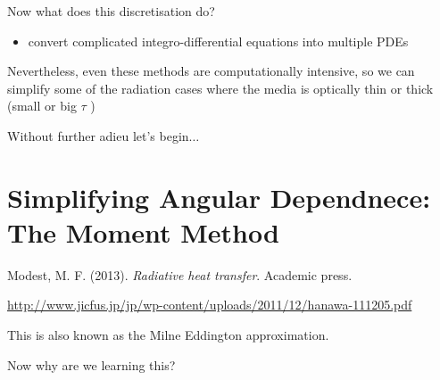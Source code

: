\documentclass[12pt]{article}
\renewcommand{\_}{\kern-1.5pt\textunderscore\kern-1.5pt}
\begin{document}
Now what does this discretisation do?\par

\begin{itemize}
	\item convert complicated integro-differential equations into multiple PDEs\par

\end{itemize}

Nevertheless, even these methods are computationally intensive, so we can simplify some of the radiation cases where the media is optically thin or thick (small or big  \(  \tau \) )\par

Without further adieu let’s begin$ \ldots $ \par

\section*{Simplifying Angular Dependnece: The Moment Method }
{\fontsize{10pt}{12.0pt}\selectfont \textcolor[HTML]{222222}{Modest, M. F. (2013). \textit{Radiative heat transfer}. Academic press.}\par}\par

\href{http://www.jicfus.jp/jp/wp-content/uploads/2011/12/hanawa-111205.pdf}{http://www.jicfus.jp/jp/wp-content/uploads/2011/12/hanawa-111205.pdf}\par

This is also known as the Milne Eddington approximation.\par

Now why are we learning this? \par
\end{document}
